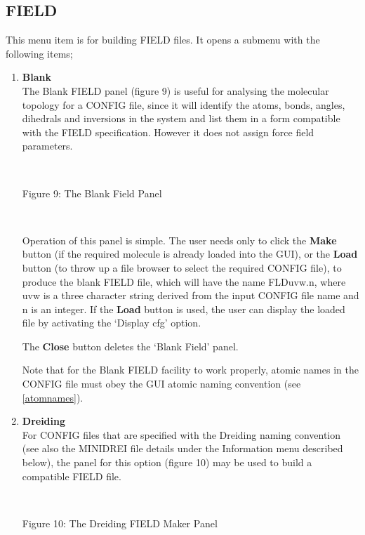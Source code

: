 \subsection{FIELD}
This menu item is for building \DD{} FIELD files. It opens a submenu with
the following items;
\begin{enumerate}
\item {\bf Blank}\\
The Blank FIELD panel (figure 9) is useful for analysing the molecular
topology for a CONFIG file, since it will identify the atoms, bonds,
angles, dihedrals and inversions in the system and list them in a form
compatible with the \DD{} FIELD specification. However it does not assign
force field parameters.

 ~

\vskip 5mm
\centerline{}
\centerline{Figure 9: The Blank Field Panel}
\vskip 5mm

~

\noindent
Operation of this panel is simple. The user needs only to click the
{\bf Make} button (if the required molecule is already loaded into the
GUI), or the {\bf Load} button (to throw up a file browser to select
the required CONFIG file), to produce the blank FIELD file, which will
have the name FLDuvw.n, where uvw is a three character string derived
from the input CONFIG file name and n is an integer. If the {\bf Load}
button is used, the user can display the loaded file by activating the
`Display cfg' option. 

The {\bf Close} button deletes the `Blank Field' panel.

Note that for the Blank FIELD facility to work properly, atomic names
in the CONFIG file must obey the GUI atomic naming convention (see \ref{atomnames}).

\item{\bf Dreiding}\\
For CONFIG files that are specified with the Dreiding naming
convention \cite{mayo-90a} (see also the MINIDREI file details under
the Information menu described below), the panel for this option
(figure 10) may be used to build a compatible FIELD file.

~

\vskip 5mm
\centerline{}
\centerline{Figure 10: The Dreiding FIELD Maker Panel}
\vskip 5mm

~


\end{enumerate}
